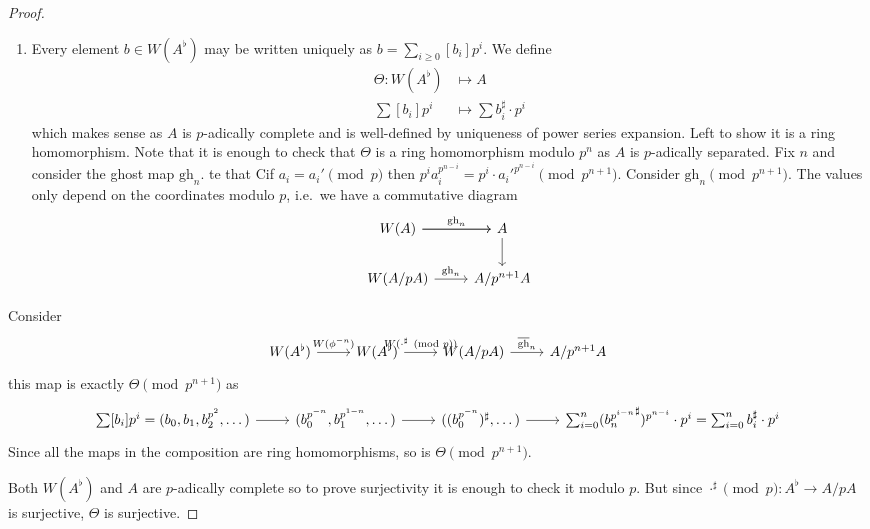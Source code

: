 \documentclass[a4paper]{article}
\newcommand{\tilt}{\flat} %
\begin{document}
\begin{proof}\leavevmode
  \begin{enumerate}
  \item Every element \(b \in W(A^\tilt)\) may be written uniquely as \(b = \sum_{i \geq 0} [b_i] p^i\). We define
    \begin{align*}
      \Theta: W(A^\tilt) &\mapsto A \\
      \sum [b_i] p^i &\mapsto \sum b_i^\sharp \cdot p^i
    \end{align*}
    which makes sense as \(A\) is \(p\)-adically complete and is well-defined by uniqueness of power series expansion. Left to show it is a ring homomorphism. Note that it is enough to check that \(\Theta\) is a ring homomorphism modulo \(p^n\) as \(A\) is \(p\)-adically separated. Fix \(n\) and consider the ghost map \(\mathrm{gh}_n\). te that Cif \(a_i = a_i' \pmod p\) then \(p^i a_i^{p^{n - i}} = p^i \cdot a_i'^{p^{n - i}} \pmod{p^{n + 1}}\). Consider \(\mathrm{gh}_n \pmod{p^{n + 1}}\). The values only depend on the coordinates modulo \(p\), i.e.\ we have a commutative diagram
    \[
      \begin{tikzcd}
        W(A) \ar[r, "\mathrm{gh}_n"] \ar[r] & A \ar[d] \\
        W(A/pA) \ar[r, "\mathrm{gh}_n"] & A/p^{n + 1}A
      \end{tikzcd}
    \]
  \end{enumerate}
  Consider
  \[
    \begin{tikzcd}
      W(A^\tilt) \ar[r, "W(\phi^{-n})"] & W(A^\tilt) \ar[r, "W(\cdot^\sharp \pmod p)"] & W(A/pA) \ar[r, "\overline{\mathrm{gh}}_n"] & A/p^{n + 1}A
    \end{tikzcd}
  \]
  this map is exactly \(\Theta \pmod{p^{n + 1}}\) as
  \[
    \begin{tikzcd}
      \sum [b_i] p^i = (b_0, b_1, b_2^{p^2}, \dots) \ar[r] & (b_0^{p^{-n}}, b_1^{p^{1 - n}}, \dots) \ar[r] & ((b_0^{p^{-n}})^\sharp, \dots) \ar[r] & \sum_{i = 0}^n ({b_n^{p^{i - n}}}^\sharp)^{p^{n - i}} \cdot p^i = \sum_{i = 0}^n b_i^\sharp \cdot p^i
    \end{tikzcd}
  \]
  Since all the maps in the composition are ring homomorphisms, so is \(\Theta \pmod{p^{n + 1}}\).
\item Both \(W(A^\tilt)\) and \(A\) are \(p\)-adically complete so to prove surjectivity it is enough to check it modulo \(p\). But since \(\cdot^\sharp \pmod p: A^\tilt \to A/pA\) is surjective, \(\Theta\) is surjective.


\end{proof}
\end{document}
